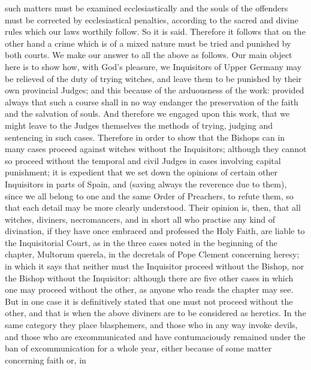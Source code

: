        such matters must be examined ecclesiastically and the souls of the offenders must be
       corrected by ecclesiastical penalties, according to the sacred and divine rules which our laws
       worthily follow. So it is said. Therefore it follows that on the other hand a crime which is of
       a mixed nature must be tried and punished by both courts.
              We make our answer to all the above as follows. Our main object here is to show how,
       with God's pleasure, we Inquisitors of Upper Germany may be relieved of the duty of trying
       witches, and leave them to be punished by their own provincial Judges; and this because of
       the arduousness of the work: provided always that such a course shall in no way endanger
       the preservation of the faith and the salvation of souls. And therefore we engaged upon this
       work, that we might leave to the Judges themselves the methods of trying, judging and
       sentencing in such cases.
              Therefore in order to show that the Bishops can in many cases proceed against witches
       without the Inquisitors; although they cannot so proceed without the temporal and civil
       Judges in cases involving capital punishment; it is expedient that we set down the opinions
       of certain other Inquisitors in parts of Spain, and (saving always the reverence due to them),
       since we all belong to one and the same Order of Preachers, to refute them, so that each
       detail may be more clearly understood.
              Their opinion is, then, that all witches, diviners, necromancers, and in short all who
       practise any kind of divination, if they have once embraced and professed the Holy Faith,
       are liable to the Inquisitorial Court, as in the three cases noted in the beginning of the
       chapter, Multorum querela, in the decretals of Pope Clement concerning heresy; in which it
       says that neither must the Inquisitor proceed without the Bishop, nor the Bishop without the
       Inquisitor: although there are five other cases in which one may proceed without the other,
       as anyone who reads the chapter may see. But in one case it is definitively stated that one
       must not proceed without the other, and that is when the above diviners are to be considered
       as heretics.
              In the same category they place blasphemers, and those who in any way invoke devils,
       and those who are excommunicated and have contumaciously remained under the ban of
       excommunication for a whole year, either because of some matter concerning faith or, in

